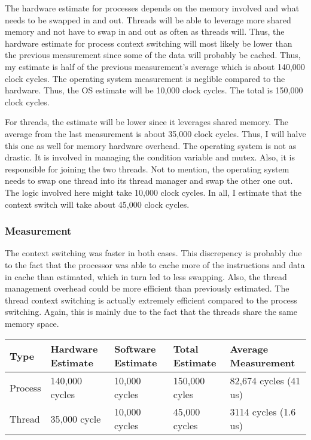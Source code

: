 \documentclass[paper=a4, fontsize=11pt]{scrartcl}
\numberwithin{equation}{section}        %
\numberwithin{figure}{section}          %
\numberwithin{table}{section}               %
\begin{document}
The hardware estimate for processes depends on the memory involved and what needs to be swapped in and out.  Threads will be able to leverage more shared memory and not have to swap in and out as often as threads will.  Thus, the hardware estimate for process context switching will most likely be lower than the previous measurement since some of the data will probably be cached.  Thus, my estimate is half of the previous measurement's average which is about 140,000 clock cycles.  The operating system measurement is neglible compared to the hardware.  Thus, the OS estimate will be 10,000 clock cycles.  The total is 150,000 clock cycles.

For threads, the estimate will be lower since it leverages shared memory.  The average from the last measurement is about 35,000 clock cycles.  Thus, I will halve this one as well for memory hardware overhead.  The operating system is not as drastic.  It is involved in managing the condition variable and mutex.  Also, it is responsible for joining the two threads.  Not to mention, the operating system needs to swap one thread into its thread manager and swap the other one out.  The logic involved here might take 10,000 clock cycles.  In all, I estimate that the context switch will take about 45,000 clock cycles.

\subsubsection{Measurement}

The context switching was faster in both cases.  This discrepency is probably due to the fact that the processor was able to cache more of the instructions and data in cache than estimated, which in turn led to less swapping.  Also, the thread management overhead could be more efficient than previously estimated.  The thread context switching is actually extremely efficient compared to the process switching.  Again, this is mainly due to the fact that the threads share the same memory space.

\begin{center}
    \begin{tabular}{ | l | l | l | l | l |}
    \hline
    Type & Hardware Estimate & Software Estimate & Total Estimate & Average Measurement \\      \hline
    Process & 140,000 cycles & 10,000 cycles & 150,000 cyles & 82,674 cycles (41 us) \\ 
    Thread & 35,000 cycle & 10,000 cycles & 45,000 cycles & 3114 cycles (1.6 us) \\
    \hline
    \end{tabular}
\end{center}
\end{document}

